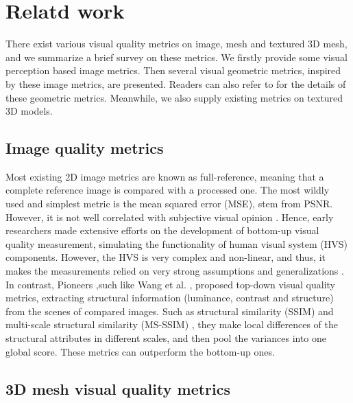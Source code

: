 \section{Relatd work}
There exist various visual quality metrics on image, mesh and textured 3D mesh, and we summarize a brief survey on these metrics. We firstly provide some visual perception based image metrics. Then several visual geometric metrics, inspired by these image metrics, are presented. Readers can also refer to \cite{Corsini_2013} for the details of these geometric metrics.  Meanwhile, we also supply existing metrics on textured 3D models. 
\subsection{Image quality metrics}
Most existing 2D image metrics are known as full-reference, meaning that a complete reference image is compared with a processed one.  The most wildly used and simplest metric is the mean squared error (MSE), stem from PSNR. However, it is not well correlated with subjective visual opinion \cite{Snyder_1985} \cite{Teo}. Hence, early researchers \cite{Mannos_1974} made extensive efforts on the development of bottom-up visual quality measurement, simulating the functionality of human visual system (HVS) components. However, the HVS is very complex and non-linear, and thus, it makes the measurements relied on very strong assumptions and generalizations \cite{Baro_1995}\cite{Xing_2002}\cite{Ramos_2001}. In contrast, Pioneers ,such like Wang et al. \cite{Wang_2004}, proposed  top-down visual quality metrics, extracting structural information (luminance, contrast and structure) from the scenes of compared images. Such as structural similarity (SSIM) \cite{Wang_2004} and multi-scale structural similarity (MS-SSIM) \cite{Zhou_Wang_2011}, they make local differences of the structural attributes in different scales, and then pool the variances into one global score. These metrics can outperform the bottom-up ones.
\subsection{3D mesh visual quality metrics}


